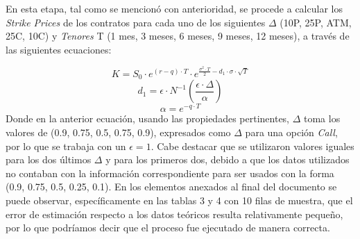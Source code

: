 En esta etapa, tal como se mencionó con anterioridad, se procede a calcular los \textit{Strike Prices} de los contratos para cada uno de los siguientes
$\Delta$ (10P, 25P, ATM, 25C, 10C) y \textit{Tenores} T (1 mes, 3 meses, 6 meses, 9 meses, 12 meses), a través de las siguientes ecuaciones:

\begin{equation}
    K=S_0 \cdot e^{(r-q)\cdot T} \cdot e^{\frac{\sigma^2 \cdot T}{2} - d_1\cdot \sigma \cdot \sqrt{T}}
\end{equation}
\begin{equation*}
    d_1= \epsilon \cdot N^{-1} \left(\frac{\epsilon \cdot \Delta }{\alpha} \right)
\end{equation*}
\begin{equation*}
    \alpha= e^{-q \cdot T}
\end{equation*}
\noindent Donde en la anterior ecuación, usando las propiedades pertinentes, $\Delta$ toma los valores de (0.9, 0.75, 0.5, 0.75, 0.9), expresados como $\Delta$ para una opción \textit{Call}, por lo que se trabaja con un $\epsilon=1$. Cabe destacar que se utilizaron valores iguales para los dos últimos $\Delta$ y para los primeros dos, debido a que los datos utilizados no contaban con la información correspondiente para ser usados con la forma (0.9, 0.75, 0.5, 0.25, 0.1). En los elementos anexados al final del documento se puede observar, específicamente en las tablas 3 y 4 con 10 filas de muestra, que el error de estimación respecto a los datos teóricos resulta relativamente pequeño, por lo que podríamos decir que el proceso fue ejecutado de manera correcta.
\newpage




